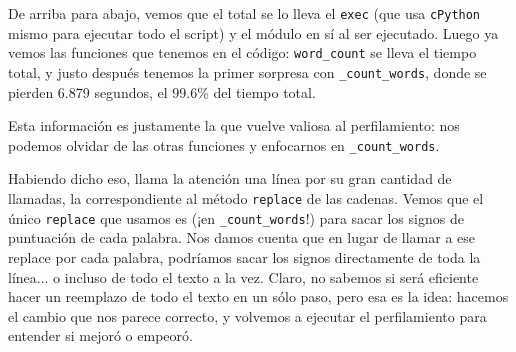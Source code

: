 
De arriba para abajo, vemos que el total se lo lleva el \texttt{exec} (que usa \texttt{cPython} mismo para ejecutar todo el script) y el módulo en sí al ser ejecutado. Luego ya vemos las funciones que tenemos en el código: \texttt{word\_count} se lleva el tiempo total, y justo después tenemos la primer sorpresa con \texttt{\_count\_words}, donde se pierden 6.879 segundos, el 99.6\% del tiempo total.

Esta información es justamente la que vuelve valiosa al perfilamiento: nos podemos olvidar de las otras funciones y enfocarnos en \texttt{\_count\_words}.

Habiendo dicho eso, llama la atención una línea por su gran cantidad de llamadas, la correspondiente al método \texttt{replace} de las cadenas. Vemos que el único \texttt{replace} que usamos es (¡en \texttt{\_count\_words}!) para sacar los signos de puntuación de cada palabra. Nos damos cuenta que en lugar de llamar a ese replace por cada palabra, podríamos sacar los signos directamente de toda la línea... o incluso de todo el texto a la vez. Claro, no sabemos si será eficiente hacer un reemplazo de todo el texto en un sólo paso, pero esa es la idea: hacemos el cambio que nos parece correcto, y volvemos a ejecutar el perfilamiento para entender si mejoró o empeoró.

